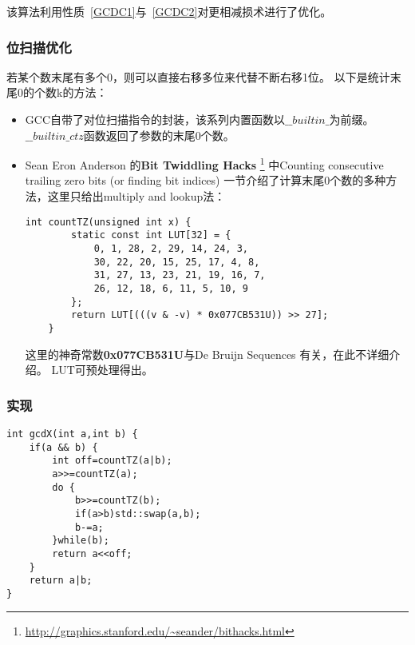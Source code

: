 该算法利用性质~\ref{GCDC1}与~\ref{GCDC2}对更相减损术进行了优化。

\subsubsection{位扫描优化}

若某个数末尾有多个0，则可以直接右移多位来代替不断右移1位。
以下是统计末尾0的个数k的方法：

\begin{itemize}
	\item GCC自带了对位扫描指令的封装，该系列内置函数以$\_\_builtin\_$为前缀。
	      $\_\_builtin\_ctz$函数返回了参数的末尾0个数。
	\item Sean Eron Anderson 的{\bfseries Bit Twiddling Hacks}
	      \footnote{\url{http://graphics.stanford.edu/~seander/bithacks.html}}
	      中Counting consecutive trailing zero bits (or finding bit indices)
	      一节介绍了计算末尾0个数的多种方法，这里只给出multiply and lookup法：
	      \begin{lstlisting}[title=countTZ]
    int countTZ(unsigned int x) {
        static const int LUT[32] = {
            0, 1, 28, 2, 29, 14, 24, 3,
            30, 22, 20, 15, 25, 17, 4, 8,
            31, 27, 13, 23, 21, 19, 16, 7,
            26, 12, 18, 6, 11, 5, 10, 9
        };
        return LUT[(((v & -v) * 0x077CB531U)) >> 27];
    }
    \end{lstlisting}
	      这里的神奇常数{\bfseries 0x077CB531U}与De Bruijn Sequences
	      有关，在此不详细介绍。
	      LUT可预处理得出。
\end{itemize}

\subsubsection{实现}
\begin{lstlisting}[title=gcdX]
int gcdX(int a,int b) {
    if(a && b) {
        int off=countTZ(a|b);
        a>>=countTZ(a);
        do {
            b>>=countTZ(b);
            if(a>b)std::swap(a,b);
            b-=a;
        }while(b);
        return a<<off;
    }
    return a|b;
}
\end{lstlisting}

